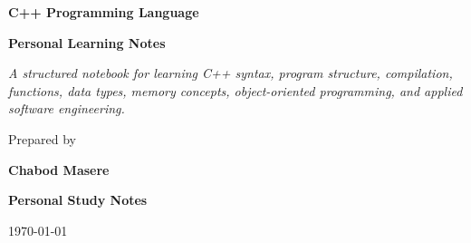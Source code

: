 \documentclass[10pt]{report}
\begin{document}
\begin{titlepage}
\thispagestyle{empty}


\centering

\vspace*{1.2cm}

{\fontsize{30}{36}\selectfont\bfseries
C++ Programming Language
\par}

\vspace{0.35cm}

{\fontsize{19}{23}\selectfont\bfseries
Personal Learning Notes
\par}

\vfill

\begin{minipage}{0.78\textwidth}
\centering
{\fontsize{13}{17}\selectfont\itshape
A structured notebook for learning C++ syntax, program structure,
compilation, functions, data types, memory concepts, object-oriented
programming, and applied software engineering.
\par}
\end{minipage}

\vfill

{\fontsize{14}{18}\selectfont
Prepared by
\par}

\vspace{0.35cm}

{\fontsize{23}{28}\selectfont\bfseries
Chabod Masere
\par}

\vspace{0.6cm}

\vfill

{\fontsize{13}{17}\selectfont\bfseries
Personal Study Notes
\par}

\vspace{0.35cm}

{\fontsize{13}{17}\selectfont
\today
\par}

\vspace*{1.2cm}

\end{titlepage}
\end{document}
